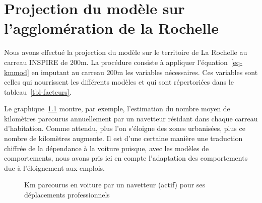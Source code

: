 \documentclass[
  9pt,
  a4paper,
  DIV=11]{scrreprt}
\begin{document}
\chapter{Projection du modèle sur l'agglomération de la
Rochelle}\label{projection-du-moduxe8le-sur-lagglomuxe9ration-de-la-rochelle}

Nous avons effectué la projection du modèle sur le territoire de La
Rochelle au carreau INSPIRE de 200m. La procédure consiste à appliquer
l'équation~\ref{eq-kmmod} en imputant au carreau 200m les variables
nécessaires. Ces variables sont celles qui nourrissent les différents
modèles et qui sont répertoriées dans le tableau~\ref{tbl-facteurs}.

Le graphique~\ref{fig-km-nav} montre, par exemple, l'estimation du
nombre moyen de kilomètres parcourus annuellement par un navetteur
résidant dans chaque carreau d'habitation. Comme attendu, plus l'on
s'éloigne des zones urbanisées, plus ce nombre de kilomètres augmente.
Il est d'une certaine manière une traduction chiffrée de la dépendance à
la voiture puisque, avec les modèles de comportements, nous avons pris
ici en compte l'adaptation des comportements due à l'éloignement aux
emplois.

\begin{figure}

\caption{\label{fig-km-nav}Km parcourus en voiture par un navetteur
(actif) pour ses déplacements professionnels}


\end{figure}%
\end{document}
